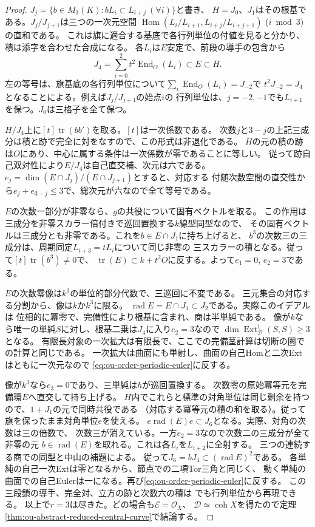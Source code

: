 \documentclass[11pt,a4paper]{ltjsarticle}
\theoremstyle{definition}
\newcommand{\coh}{\operatorname{coh}}
\begin{document}
\begin{proof}
$J_j=\{b\in M_3(K):bL_i\subset L_{i+j}\ (\forall i)\}$と書き、
$H=J_0$、$J_1$はその根基である。$J_j/J_{j+1}$は三つの一次元空間
$\operatorname{Hom}(L_i/L_{i+1},L_{i+j}/L_{i+j+1})$ ($i\bmod 3$)の直和である。
これは旗に適合する基底で各行列単位の付値を見ると分かり、積は添字を合わせた合成になる。
各$L_i$は$E$安定で、前段の導手の包含から
\[
        J_4=\sum_{i=0}^2 t^2\operatorname{End}_O(L_i)\subset E\subset H .
\]
左の等号は、旗基底の各行列単位について$\sum_i\operatorname{End}_O(L_i)=J_{-2}$で
$t^2J_{-2}=J_4$となることによる。例えば$J_j/J_{j+1}$の始点$i$の
行列単位は、$j=-2,-1$でも$L_{i+1}$を保つ。$J_0$は三格子を全て保つ。

$H/J_4$上に$[t]\operatorname{tr}(bb')$を取る。$[t]$は一次係数である。
次数$j$と$3-j$の上記三成分は積と跡で完全に対をなすので、この形式は非退化である。
$H$の元の積の跡は$O$にあり、中心に属する条件は一次係数が零であることに等しい。
従って跡自己双対性により$E/J_4$は自己直交補、次元は六である。
$e_j=\dim (E\cap J_j)/(E\cap J_{j+1})$とすると、対応する
付随次数空間の直交性から$e_j+e_{3-j}\le3$で、総次元が六なので全て等号である。

$E$の次数一部分が非零なら、$g$の共役について固有ベクトルを取る。
この作用は三成分を非零スカラー倍付きで巡回置換する$k$線型同型なので、
その固有ベクトルは三成分とも非零である。これを$b\in E\cap J_1$に持ち上げると、
$b^3$の次数三の三成分は、周期同定$L_{i+3}=tL_i$について同じ非零の
三スカラーの積となる。従って$[t]\operatorname{tr}(b^3)\ne0$で、
$\operatorname{tr}(E)\subset k+t^2O$に反する。よって$e_1=0$, $e_2=3$である。

$E$の次数零像は$k^3$の単位的部分代数で、三巡回に不変である。
三元集合の対応する分割から、像は$k$か$k^3$に限る。
$\operatorname{rad} E=E\cap J_1\subset J_2$である。実際このイデアルは
位相的に冪零で、完備性により根基に含まれ、商は半単純である。
像が$k$なら唯一の単純$S$に対し、根基二乗は$J_4$に入り$e_2=3$なので
$\dim\operatorname{Ext}^1_{\mathcal D}(S,S)\ge3$となる。
有限長対象の一次拡大は有限長で、ここでの完備茎計算は切断の圏での計算と同じである。
一次拡大は曲面にも単射し、曲面の自己Homと二次Extはともに一次元なので
\eqref{eq:ou-order-periodic-euler}に反する。

像が$k^3$なら$e_3=0$であり、三単純は$h$が巡回置換する。
次数零の原始冪等元を完備環$E$へ直交して持ち上げる。
$H$内でこれらと標準の対角単位は同じ剰余を持つので、$1+J_1$の元で同時共役である
（対応する冪等元の積の和を取る）。従って旗を保ったまま対角単位$e$を使える。
$e\operatorname{rad}(E)e\subset J_6$となる。実際、対角の次数は三の倍数で、
次数三が消えている。一方$e_2=3$なので次数二の三成分が全て非零の元
$b\in\operatorname{rad}(E)$を取れる。これは各$L_i$を$L_{i+2}$に全射する。
三つの連続する商での同型と中山の補題による。
従って$J_6=bJ_4\subset(\operatorname{rad}E)^2$である。
各単純の自己一次Extは零となるから、節点での二項Tor三角と同じく、
動く単純の曲面での自己Eulerは一になる。再び\eqref{eq:ou-order-periodic-euler}に反する。
この三段鎖の導手、完全対、立方の跡と次数六の積は
でも行列単位から再現できる。
以上で$r=3$は尽きた。どの場合も$\mathcal E=\mathcal O_X$、
$\mathcal D\simeq\coh X$を得たので定理\ref{thm:ou-abstract-reduced-central-curve}で結論する。
\end{proof}
\end{document}
